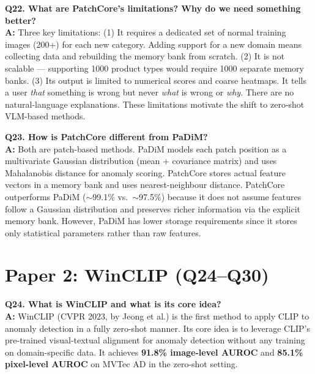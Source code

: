 \documentclass[12pt, a4paper]{article}
\begin{document}
\begin{qa}
\textbf{Q22. What are PatchCore's limitations? Why do we need something better?}\\[4pt]
\textbf{A:} Three key limitations: (1) It requires a dedicated set of normal training images (200+) for each new category. Adding support for a new domain means collecting data and rebuilding the memory bank from scratch. (2) It is not scalable --- supporting 1000 product types would require 1000 separate memory banks. (3) Its output is limited to numerical scores and coarse heatmaps. It tells a user \textit{that} something is wrong but never \textit{what} is wrong or \textit{why}. There are no natural-language explanations. These limitations motivate the shift to zero-shot VLM-based methods.
\end{qa}

\begin{qa}
\textbf{Q23. How is PatchCore different from PaDiM?}\\[4pt]
\textbf{A:} Both are patch-based methods. PaDiM models each patch position as a multivariate Gaussian distribution (mean + covariance matrix) and uses Mahalanobis distance for anomaly scoring. PatchCore stores actual feature vectors in a memory bank and uses nearest-neighbour distance. PatchCore outperforms PaDiM ($\sim$99.1\% vs.\ $\sim$97.5\%) because it does not assume features follow a Gaussian distribution and preserves richer information via the explicit memory bank. However, PaDiM has lower storage requirements since it stores only statistical parameters rather than raw features.
\end{qa}

\section{Paper 2: WinCLIP (Q24--Q30)}

\begin{qa}
\textbf{Q24. What is WinCLIP and what is its core idea?}\\[4pt]
\textbf{A:} WinCLIP (CVPR 2023, by Jeong et al.) is the first method to apply CLIP to anomaly detection in a fully zero-shot manner. Its core idea is to leverage CLIP's pre-trained visual-textual alignment for anomaly detection without any training on domain-specific data. It achieves \textbf{91.8\% image-level AUROC} and \textbf{85.1\% pixel-level AUROC} on MVTec AD in the zero-shot setting.
\end{qa}
\end{document}
